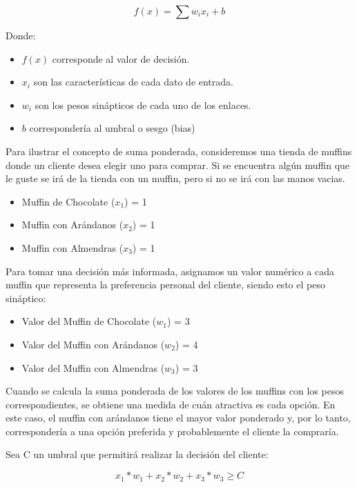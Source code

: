 \documentclass[journal]{IEEEtai}
\begin{document}
\begin{equation}
	f(x) = \sum{w_{i}x_{i}}  + b
\end{equation}

Donde:

\begin{itemize}
\item	$f(x)$ corresponde al valor de decisión.
\item	$x_i$ son las características de cada dato de entrada.
\item	$w_i$ son los pesos sinápticos de cada uno de los enlaces.
\item   $b$ correspondería al umbral o sesgo (bias)
\end{itemize}

Para ilustrar el concepto de suma ponderada, consideremos una tienda de muffins donde un cliente desea elegir uno para comprar. Si se encuentra algún muffin que le guste se irá de la tienda con un muffin, pero si no se irá con las manos vacias.

\begin{itemize}
    \item Muffin de Chocolate ($x_1$) = 1
    \item Muffin con Arándanos ($x_2$) = 1
    \item Muffin con Almendras ($x_3$) = 1
\end{itemize}

Para tomar una decisión más informada, asignamos un valor numérico a cada muffin que representa la preferencia personal del cliente, siendo esto el peso sináptico:

\begin{itemize}
    \item Valor del Muffin de Chocolate ($w_1$) = 3
    \item Valor del Muffin con Arándanos ($w_2$) = 4
    \item Valor del Muffin con Almendras ($w_3$) = 3
\end{itemize}
Cuando se calcula la suma ponderada de los valores de los muffins con los pesos correspondientes, se obtiene una medida de cuán atractiva es cada opción. En este caso, el muffin con arándanos tiene el mayor valor ponderado y, por lo tanto, correspondería a una opción preferida y probablemente el cliente la compraría.

Sea C un umbral que permitirá realizar la decisión del cliente:

\begin{equation}
	x_{1} * w_{1}+ x_{2} * w_{2} + x_{3} * w_{3} \geq C
\end{equation}
\end{document}
